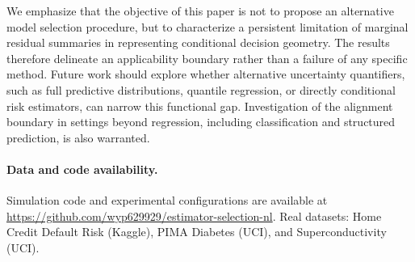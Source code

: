 \documentclass[a4paper,11pt]{article}
\begin{document}
We emphasize that the objective of this paper is not to propose an alternative model selection procedure, but to characterize a persistent limitation of marginal residual summaries in representing conditional decision geometry. The results therefore delineate an applicability boundary rather than a failure of any specific method. Future work should explore whether alternative uncertainty quantifiers, such as full predictive distributions, quantile regression, or directly conditional risk estimators, can narrow this functional gap. Investigation of the alignment boundary in settings beyond regression, including classification and structured prediction, is also warranted.

\paragraph{Data and code availability.}
Simulation code and experimental configurations are available at \url{https://github.com/wyp629929/estimator-selection-nl}. Real datasets: Home Credit Default Risk (Kaggle), PIMA Diabetes (UCI), and Superconductivity (UCI).


\end{document}
